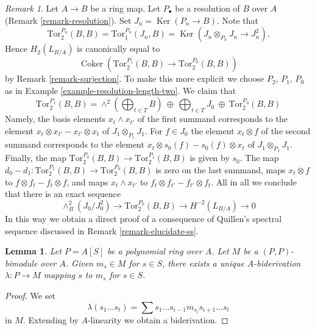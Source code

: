 \documentclass[10pt,a4paper]{amsart}
\theoremstyle{plain}
\newtheorem{lemma}[subsection]{Lemma}
\theoremstyle{definition}
\theoremstyle{remark}
\newtheorem{remark}[subsection]{Remark}
\numberwithin{equation}{subsection}
\def\Ker{\mathop{\mathrm{Ker}}}
\def\Coker{\mathop{\mathrm{Coker}}}
\begin{document}
\begin{remark}
\label{remark-elucidate-degree-two}
Let $A \to B$ be a ring map. Let $P_\bullet$ be a resolution of
$B$ over $A$ (Remark \ref{remark-resolution}).
Set $J_n = \Ker(P_n \to B)$. Note that
$$
\text{Tor}_2^{P_n}(B, B) = 
\text{Tor}_1^{P_n}(J_n, B) =
\Ker(J_n \otimes_{P_n} J_n \to J_n^2).
$$
Hence $H_2(L_{B/A})$ is canonically equal to
$$
\Coker(\text{Tor}_2^{P_1}(B, B) \to \text{Tor}_2^{P_0}(B, B))
$$
by Remark \ref{remark-surjection}. To make this more explicit we choose
$P_2$, $P_1$, $P_0$ as in Example \ref{example-resolution-length-two}.
We claim that
$$
\text{Tor}_2^{P_1}(B, B) =
\wedge^2(\bigoplus\nolimits_{t \in T} B)\ \oplus
\ \bigoplus\nolimits_{t \in T} J_0\ \oplus
\ \text{Tor}_2^{P_0}(B, B)
$$
Namely, the basis elements $x_t \wedge x_{t'}$ of the first summand
corresponds to the element $x_t \otimes x_{t'} - x_{t'} \otimes x_t$
of $J_1 \otimes_{P_1} J_1$. For $f \in J_0$ the element $x_t \otimes f$
of the second summand corresponds to the element
$x_t \otimes s_0(f) - s_0(f) \otimes x_t$ of $J_1 \otimes_{P_1} J_1$.
Finally, the map $\text{Tor}_2^{P_0}(B, B) \to \text{Tor}_2^{P_1}(B, B)$
is given by $s_0$. The map
$d_0 - d_1 : \text{Tor}_2^{P_1}(B, B) \to \text{Tor}_2^{P_0}(B, B)$
is zero on the last summand, maps $x_t \otimes f$ to
$f \otimes f_t - f_t \otimes f$, and maps $x_t \wedge x_{t'}$
to $f_t \otimes f_{t'} - f_{t'} \otimes f_t$. All in all we conclude
that there is an exact sequence
$$
\wedge^2_B(J_0/J_0^2) \to \text{Tor}_2^{P_0}(B, B) \to H^{-2}(L_{B/A}) \to 0
$$
In this way we obtain a direct proof of a consequence of Quillen's spectral
sequence discussed in Remark \ref{remark-elucidate-ss}.
\end{remark}

\begin{lemma}
\label{lemma-polynomial-ring-unique}
Let $P = A[S]$ be a polynomial ring over $A$. Let $M$ be a $(P, P)$-bimodule
over $A$. Given $m_s \in M$ for $s \in S$, there exists a unique
$A$-biderivation $\lambda : P \to M$ mapping $s$ to $m_s$ for $s \in S$.
\end{lemma}

\begin{proof}
We set
$$
\lambda(s_1 \ldots s_t) =
\sum s_1 \ldots s_{i - 1} m_{s_i} s_{i + 1} \ldots s_t
$$
in $M$. Extending by $A$-linearity we obtain a biderivation.
\end{proof}
\end{document}
